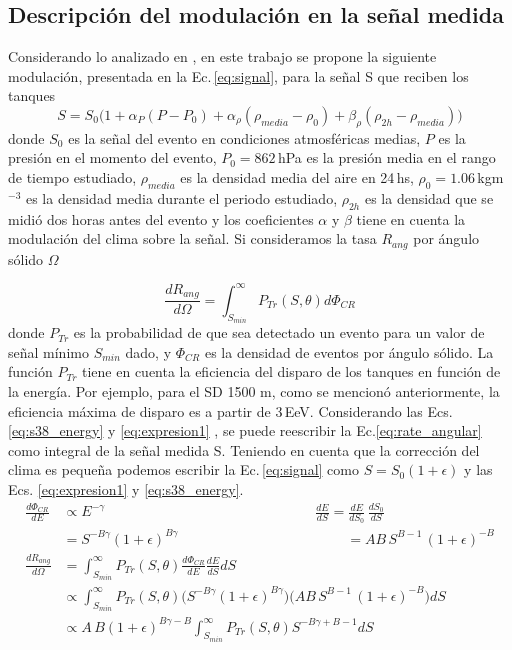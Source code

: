 \subsection{Descripción del modulación en la señal medida}

Considerando lo analizado en \cite{aab2017impact} \cite{collaboration2009atmospheric}, en este trabajo se propone la siguiente modulación, presentada en la Ec.\,\ref{eq:signal}, para la señal S que reciben los tanques 
\begin{equation}
	S=S_0\big(1+\alpha_P(P-P_0) +\alpha_{\rho}(\rho_{media}-\rho_0) + \beta_{\rho}(\rho_{2h}-\rho_{media})\big)
	\label{eq:signal}
\end{equation}
donde $S_0$ es la señal  del evento en condiciones atmosféricas medias, $P$ es la presión en el momento del evento, $P_0=862\,$hPa es la presión media en el rango de tiempo estudiado, $\rho_{media}$ es la densidad  media del aire en 24\,hs, $\rho_0=1.06\,$kgm$^{-3}$ es la densidad media durante el periodo estudiado, $\rho_{2h}$ es la densidad que se midió dos horas antes del evento  y los coeficientes $\alpha$ y $\beta$ tiene en cuenta la modulación del clima sobre la señal.  Si consideramos la tasa $R_{ang}$  por ángulo sólido $\Omega$

\begin{equation}
	\frac{dR_{ang}}{d\Omega} = \int_{S_{min}}^{\infty} P_{Tr}(S,\theta) d\Phi_{CR}
	\label{eq:rate_angular}
\end{equation}
donde $P_{Tr}$ es la probabilidad de que sea detectado un evento para un valor de señal mínimo $S_{min}$ dado, y $\Phi_{CR}$ es la densidad de eventos por ángulo sólido. La función $P_{Tr}$ tiene en cuenta la eficiencia del disparo de los tanques en función de la energía. Por ejemplo, para el SD 1500 m, como se mencionó anteriormente, la eficiencia máxima de disparo es a partir  de $3\,$EeV. Considerando  las Ecs.\,\ref{eq:s38_energy} y \ref{eq:expresion1} , se puede reescribir la Ec.\ref{eq:rate_angular} como integral de la señal medida S. Teniendo en cuenta que la corrección del clima es pequeña podemos escribir la Ec.\,\ref{eq:signal} como $S=S_0(1+\epsilon)$ y las Ecs. \ref{eq:expresion1} y \ref{eq:s38_energy}.
\begin{align*}
\frac{d\Phi_{CR}}{dE} 	&\propto E^{-\gamma} 					\qquad\qquad\qquad\qquad\qquad \quad \qquad \qquad		\frac{dE}{dS}  			= \frac{dE}{dS_0}\,\frac{dS_0}{dS}\\ 
					  	&= S^{-B\gamma}(1+\epsilon)^{B\gamma}    \qquad\qquad \qquad\qquad\qquad \qquad 				  	 = AB\,S^{B-1}\, (1+\epsilon)^{-B}\\
   		    			\frac{dR_{ang}}{d\Omega} &= \int_{S_{min}}^{\infty} P_{Tr}(S,\theta) \frac{d\Phi_{CR}}{dE} \frac{dE}{dS} dS\\
    						 &\propto \int_{S_{min}}^{\infty} P_{Tr}(S,\theta) \bigg( S^{-B\gamma}(1+\epsilon)^{B\gamma}\bigg) \bigg( AB\,S^{B-1}\, (1+\epsilon)^{-B}\bigg)dS\\
    						 &\propto A\,B (1+\epsilon)^{B\gamma - B}\int_{S_{min}}^{\infty} P_{Tr}(S,\theta) S^{-B\gamma +B -1} dS\\
\end{align*}

